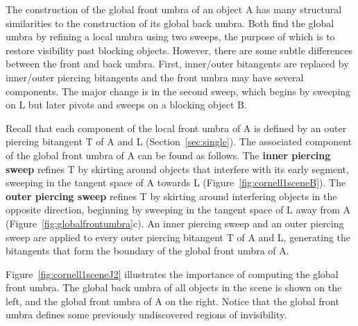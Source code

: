 \documentclass[9pt,twocolumn]{article}
\begin{document}
The construction of the global front umbra of an object A
has many structural similarities to the construction of its global back umbra.
Both find the global umbra by refining a local umbra using two sweeps,
the purpose of which is to restore visibility past blocking objects.
However, there are some subtle differences between the front and back umbra.
First, inner/outer bitangents are replaced by inner/outer piercing bitangents
and the front umbra may have several components.
The major change is in the second sweep, which begins by sweeping on L but later pivots
and sweeps on a blocking object B.

Recall that each component of the local front umbra of A is defined by
an outer piercing bitangent T of A and L (Section~\ref{sec:single}).
The associated component of the global front umbra of A can be found as follows.
The {\bf inner piercing sweep} refines T by skirting around objects that interfere 
with its early segment, sweeping in the tangent space of A towards L
(Figure~\ref{fig:cornell1sceneB}).
The {\bf outer piercing sweep} refines T by skirting around interfering objects 
in the opposite direction, beginning by sweeping in the tangent space of L away from A
(Figure~\ref{fig:globalfrontumbra}c).
An inner piercing sweep and an outer piercing sweep are applied to every outer 
piercing bitangent T of A and L,
generating the bitangents that form the boundary of the global front umbra of A.

Figure~\ref{fig:cornell1sceneJ2} %
illustrates the importance of computing the global front umbra.
The global back umbra of all objects in the scene is shown on the left,
and the global front umbra of A on the right.
Notice that the global front umbra defines some previously undiscovered regions
of invisibility.
\end{document}
